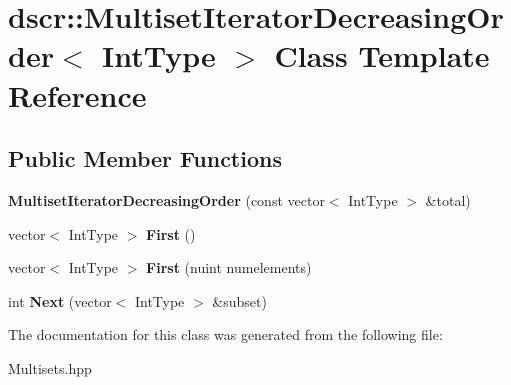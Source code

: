 \hypertarget{classdscr_1_1_multiset_iterator_decreasing_order}{\section{dscr\-:\-:Multiset\-Iterator\-Decreasing\-Order$<$ Int\-Type $>$ Class Template Reference}
\label{classdscr_1_1_multiset_iterator_decreasing_order}
}
\subsection*{Public Member Functions}
\begin{DoxyCompactItemize}
\item 
\hypertarget{classdscr_1_1_multiset_iterator_decreasing_order_af5925e1320a932c86a59b6e02c17cb66}{{\bfseries Multiset\-Iterator\-Decreasing\-Order} (const vector$<$ Int\-Type $>$ \&total)}\label{classdscr_1_1_multiset_iterator_decreasing_order_af5925e1320a932c86a59b6e02c17cb66}

\item 
\hypertarget{classdscr_1_1_multiset_iterator_decreasing_order_a7d9be875203335059656a40cf1dcf504}{vector$<$ Int\-Type $>$ {\bfseries First} ()}\label{classdscr_1_1_multiset_iterator_decreasing_order_a7d9be875203335059656a40cf1dcf504}

\item 
\hypertarget{classdscr_1_1_multiset_iterator_decreasing_order_afb982addc5236662904e37f2c3c723ef}{vector$<$ Int\-Type $>$ {\bfseries First} (nuint numelements)}\label{classdscr_1_1_multiset_iterator_decreasing_order_afb982addc5236662904e37f2c3c723ef}

\item 
\hypertarget{classdscr_1_1_multiset_iterator_decreasing_order_a5c49e27584d8a36dde26d4f7d4129b29}{int {\bfseries Next} (vector$<$ Int\-Type $>$ \&subset)}\label{classdscr_1_1_multiset_iterator_decreasing_order_a5c49e27584d8a36dde26d4f7d4129b29}

\end{DoxyCompactItemize}


The documentation for this class was generated from the following file\-:\begin{DoxyCompactItemize}
\item 
Multisets.\-hpp\end{DoxyCompactItemize}

